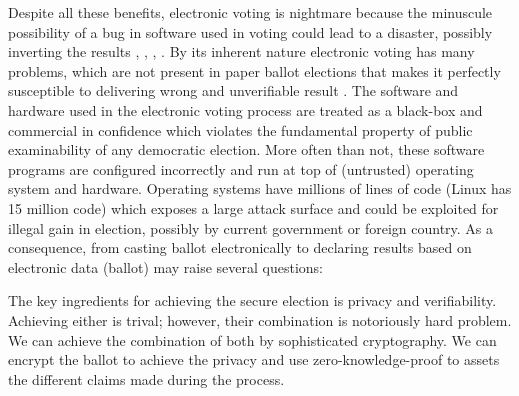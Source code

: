   Despite all these benefits, electronic voting is nightmare because the minuscule possibility of 
   a bug in software used in voting could lead to a disaster, possibly 
   inverting the results \citep{TSwiss},
   \citep{10.1007/978-3-319-22270-7_3}, \citep{ARANHA2019335},
   \citep{Feldman:2007:SAD:1323111.1323113}. 
   By its inherent nature electronic voting has many 
   problems, which are not present in paper ballot elections that makes it perfectly susceptible 
   to delivering wrong and unverifiable result  \citep{Wolchok:2010:SAI:1866307.1866309}.
   The software and hardware used in the electronic voting process  
	are treated as a black-box and commercial in confidence \citep{AEC:2013:LMM} which  
	violates the fundamental property of  public examinability of any democratic election. 
	More often than not, these software programs are configured incorrectly \citep{1301313} and 
	run at top of (untrusted) operating system and hardware.  Operating systems have
	millions of lines of code (Linux has 15 million code) which exposes a large attack surface 
	and could be  exploited for illegal gain in election, possibly by 
	current government or foreign country.  As a consequence,  from casting ballot electronically to declaring 
	results based on electronic data (ballot) may raise several questions:
	



The key ingredients for achieving the secure election is privacy and verifiability. Achieving either is trival; however, 
their combination is notoriously hard problem. We can achieve the combination of both by sophisticated cryptography. 
We can encrypt the ballot to achieve the privacy and use zero-knowledge-proof to assets the different claims made during 
the process.  





































   
   
   
   
   
   